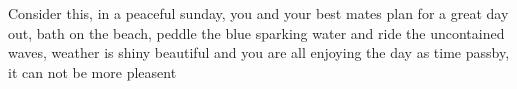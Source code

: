 Consider this, in a peaceful sunday, you and your best mates plan for a great day out, bath on the beach, peddle the blue sparking water and ride the uncontained waves, weather is shiny beautiful and you are all enjoying the day as time passby, it can not be more pleasent 